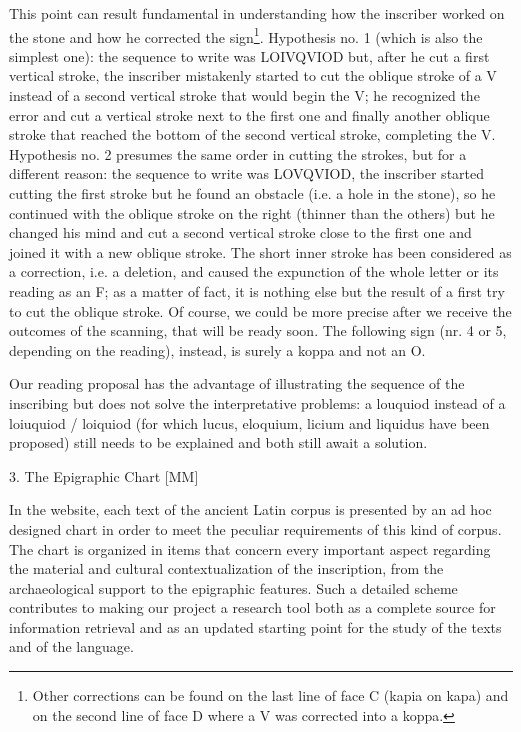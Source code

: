 \documentclass[amsthm,ebook]{saparticle}
\begin{document}
This point can result fundamental in understanding how the inscriber worked on the stone and how he corrected the
sign\footnote{Other corrections can be found on the last line of face C (kapia on kapa) and on the second line of face
D where a V was corrected into a koppa. }. Hypothesis no. 1 (which is also the simplest one): the sequence to write was
LOIVQVIOD but, after he cut a first vertical stroke, the inscriber mistakenly started to cut the oblique stroke of a V
instead of a second vertical stroke that would begin the V; he recognized the error and cut a vertical stroke next to
the first one and finally another oblique stroke that reached the bottom of the second vertical stroke, completing the
V. Hypothesis no. 2 presumes the same order in cutting the strokes, but for a different reason: the sequence to write
was LOVQVIOD, the inscriber started cutting the first stroke but he found an obstacle (i.e. a hole in the stone), so he
continued with the oblique stroke on the right (thinner than the others) but he changed his mind and cut a second
vertical stroke close to the first one and joined it with a new oblique stroke. The short inner stroke has been
considered as a correction, i.e. a deletion, and caused the expunction of the whole letter or its reading as an F; as a
matter of fact, it is nothing else but the result of a first try to cut the oblique stroke. Of course, we could be more
precise after we receive the outcomes of the scanning, that will be ready soon. The following sign (nr. 4 or 5,
depending on the reading), instead, is surely a koppa and not an O.

Our reading proposal has the advantage of illustrating the sequence of the inscribing but does not solve the
interpretative problems: a louquiod instead of a loiuquiod / loiquiod (for which lucus, eloquium, licium and liquidus
have been proposed) still needs to be explained and both still await a solution. 

3. The Epigraphic Chart [MM]

In the website, each text of the ancient Latin corpus is presented by an ad hoc designed chart in order to meet the
peculiar requirements of this kind of corpus. The chart is organized in items that concern every important aspect
regarding the material and cultural contextualization of the inscription, from the archaeological support to the
epigraphic features. Such a detailed scheme contributes to making our project a research tool both as a complete source
for information retrieval and as an updated starting point for the study of the texts and of the language.
\end{document}
